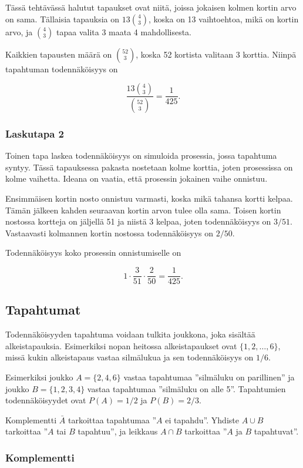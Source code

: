 Tässä tehtävässä halutut tapaukset ovat niitä,
joissa jokaisen kolmen kortin arvo on sama.
Tällaisia tapauksia on $13 {4 \choose 3}$,
koska on 13 vaihtoehtoa, mikä on kortin arvo,
ja ${4 \choose 3}$ tapaa valita 3 maata 4 mahdollisesta.

Kaikkien tapausten määrä on ${52 \choose 3}$,
koska 52 kortista valitaan 3 korttia.
Niinpä tapahtuman todennäköisyys on

\[\frac{13 {4 \choose 3}}{{52 \choose 3}} = \frac{1}{425}.\]

\subsubsection*{Laskutapa 2}

Toinen tapa laskea todennäköisyys on simuloida prosessia,
jossa tapahtuma syntyy.
Tässä tapauksessa pakasta nostetaan kolme korttia,
joten prosessissa on kolme vaihetta.
Ideana on vaatia, että prosessin jokainen vaihe onnistuu.

Ensimmäisen kortin nosto onnistuu varmasti,
koska mikä tahansa kortti kelpaa.
Tämän jälkeen kahden seuraavan kortin
arvon tulee olla sama.
Toisen kortin nostossa kortteja on jäljellä 51
ja niistä 3 kelpaa, joten todennäköisyys on $3/51$.
Vastaavasti kolmannen kortin nostossa
todennäköisyys on $2/50$.

Todennäköisyys koko prosessin onnistumiselle on

\[1 \cdot \frac{3}{51} \cdot \frac{2}{50} = \frac{1}{425}.\]

\subsection{Tapahtumat}

Todennäköisyyden tapahtuma voidaan tulkita
joukkona, joka sisältää alkeistapauksia.
Esimerkiksi nopan heitossa alkeistapaukset
ovat $\{1,2,\ldots,6\}$, missä kukin
alkeistapaus vastaa silmälukua
ja sen todennäköisyys on $1/6$.

Esimerkiksi joukko $A=\{2,4,6\}$
vastaa tapahtumaa ''silmäluku on parillinen''
ja joukko $B=\{1,2,3,4\}$ vastaa tapahtumaa
''silmäluku on alle 5''.
Tapahtumien todennäköisyydet ovat $P(A)=1/2$
ja $P(B)=2/3$.

Komplementti $\bar A$
tarkoittaa tapahtumaa ''$A$ ei tapahdu''.
Yhdiste $A \cup B$
tarkoittaa ''$A$ tai $B$ tapahtuu'',
ja leikkaus
$A \cap B$ tarkoittaa
''$A$ ja $B$ tapahtuvat''.

\subsubsection*{Komplementti}

